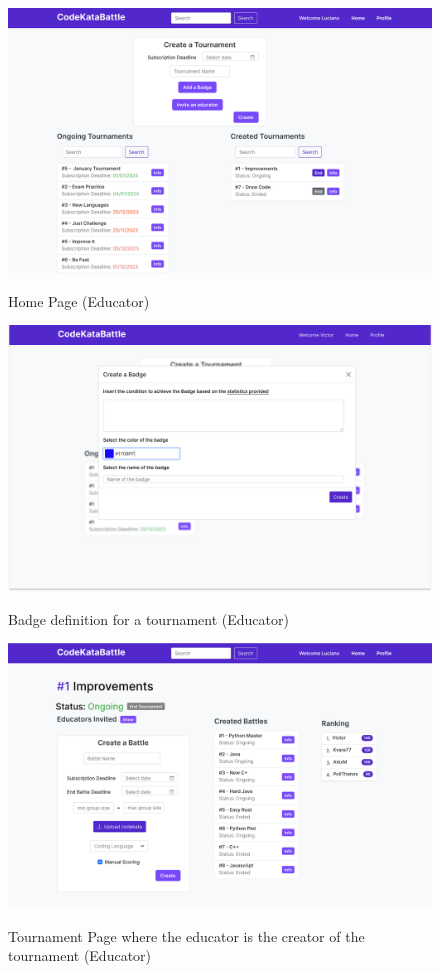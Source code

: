 \documentclass{Configuration_Files/Template}
\begin{document}
\begin{figure}[H]
\centering
\includegraphics[scale = 0.25]{DD_latex/Images/UI/MainPageEducator.png}\\
\caption{Home Page (Educator)}
\end{figure}

\begin{figure}[H]
\centering
\includegraphics[scale = 0.25]{DD_latex/Images/UI/MainPageEducator-1.png}\\
\caption{Badge definition for a tournament (Educator)}
\end{figure}

\begin{figure}[H]
\centering
\includegraphics[scale = 0.25]{DD_latex/Images/UI/TournamentPage_EducatorCreator.png}\\
\caption{Tournament Page where the educator is the creator of the tournament (Educator)}
\end{figure}
\end{document}
